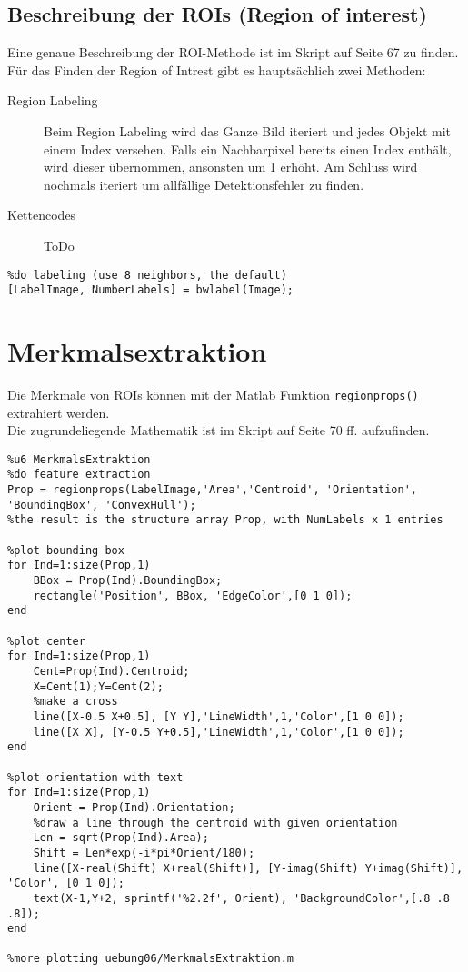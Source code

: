 \subsection{Beschreibung der ROIs (Region of interest)}
Eine genaue Beschreibung der ROI-Methode ist im Skript auf Seite 67 zu finden.\\
Für das Finden der Region of Intrest gibt es hauptsächlich zwei Methoden:
\begin{description}
    \item[Region Labeling] Beim Region Labeling wird das Ganze Bild iteriert und jedes Objekt mit einem Index versehen. Falls ein Nachbarpixel bereits einen Index enthält, wird dieser übernommen, ansonsten um 1 erhöht. Am Schluss wird nochmals iteriert um allfällige Detektionsfehler zu finden.
    \item[Kettencodes] ToDo
\end{description}
\begin{lstlisting}
%do labeling (use 8 neighbors, the default)
[LabelImage, NumberLabels] = bwlabel(Image);
\end{lstlisting}

\section{Merkmalsextraktion}
Die Merkmale von ROIs können mit der Matlab Funktion \lstinline|regionprops()| extrahiert werden.\\
Die zugrundeliegende Mathematik ist im Skript auf Seite 70 ff. aufzufinden.
\begin{lstlisting}
%u6 MerkmalsExtraktion
%do feature extraction 
Prop = regionprops(LabelImage,'Area','Centroid', 'Orientation', 'BoundingBox', 'ConvexHull');
%the result is the structure array Prop, with NumLabels x 1 entries

%plot bounding box
for Ind=1:size(Prop,1)
    BBox = Prop(Ind).BoundingBox;
    rectangle('Position', BBox, 'EdgeColor',[0 1 0]);
end

%plot center
for Ind=1:size(Prop,1)
    Cent=Prop(Ind).Centroid;
    X=Cent(1);Y=Cent(2);
    %make a cross
    line([X-0.5 X+0.5], [Y Y],'LineWidth',1,'Color',[1 0 0]);
    line([X X], [Y-0.5 Y+0.5],'LineWidth',1,'Color',[1 0 0]);
end

%plot orientation with text
for Ind=1:size(Prop,1)
    Orient = Prop(Ind).Orientation;
    %draw a line through the centroid with given orientation
    Len = sqrt(Prop(Ind).Area);
    Shift = Len*exp(-i*pi*Orient/180);
    line([X-real(Shift) X+real(Shift)], [Y-imag(Shift) Y+imag(Shift)], 'Color', [0 1 0]);
    text(X-1,Y+2, sprintf('%2.2f', Orient), 'BackgroundColor',[.8 .8 .8]);
end

%more plotting uebung06/MerkmalsExtraktion.m
\end{lstlisting}

